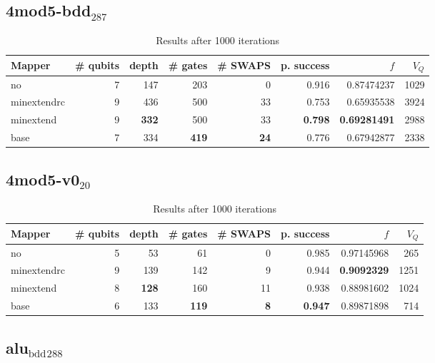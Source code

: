 \documentclass[11pt]{article}
\begin{document}
\subsection{4mod5-bdd\(_{\text{287}}\)}
\label{sec:orgae27c03}
\begin{table}[H]
\caption{\label{tab:org5c59bb2}
Results after 1000 iterations}
\centering
\small
\begin{tabular}{lrrrrrrr}
\hline
Mapper & \# qubits & depth & \# gates & \# SWAPS & p. success & \(f\) & \(V_Q\)\\
\hline
no & 7 & 147 & 203 & 0 & 0.916 & 0.87474237 & 1029\\
\hline
minextendrc & 9 & 436 & 500 & 33 & 0.753 & 0.65935538 & 3924\\
minextend & 9 & \textbf{332} & 500 & 33 & \textbf{0.798} & \textbf{0.69281491} & 2988\\
base & 7 & 334 & \textbf{419} & \textbf{24} & 0.776 & 0.67942877 & 2338\\
\hline
\end{tabular}
\end{table}


\subsection{4mod5-v0\(_{\text{20}}\)}
\label{sec:org3c31799}
\begin{table}[H]
\caption{\label{tab:orga79fef7}
Results after 1000 iterations}
\centering
\small
\begin{tabular}{lrrrrrrr}
\hline
Mapper & \# qubits & depth & \# gates & \# SWAPS & p. success & \(f\) & \(V_Q\)\\
\hline
no & 5 & 53 & 61 & 0 & 0.985 & 0.97145968 & 265\\
\hline
minextendrc & 9 & 139 & 142 & 9 & 0.944 & \textbf{0.9092329} & 1251\\
minextend & 8 & \textbf{128} & 160 & 11 & 0.938 & 0.88981602 & 1024\\
base & 6 & 133 & \textbf{119} & \textbf{8} & \textbf{0.947} & 0.89871898 & 714\\
\hline
\end{tabular}
\end{table}

\subsection{alu\(_{\text{bdd}}\)\(_{\text{288}}\)}
\label{sec:org16b3ad6}
\end{document}
